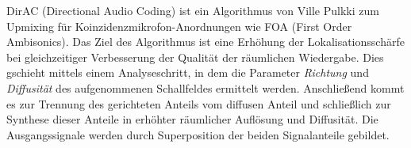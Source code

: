 DirAC (Directional Audio Coding) ist ein Algorithmus von Ville Pulkki \cite{pulkki} zum Upmixing für Koinzidenzmikrofon-Anordnungen wie FOA (First Order Ambisonics). Das Ziel des Algorithmus ist eine Erhöhung der Lokalisationsschärfe bei gleichzeitiger Verbesserung der Qualität der räumlichen Wiedergabe. Dies gschieht mittels einem Analyseschritt, in dem die Parameter \textit{Richtung} und \textit{Diffusität} des aufgenommenen Schallfeldes ermittelt werden. Anschließend kommt es zur Trennung des gerichteten Anteils vom diffusen Anteil und schließlich zur Synthese dieser Anteile in erhöhter räumlicher Auflösung und Diffusität. Die Ausgangssignale werden durch Superposition der beiden Signalanteile gebildet.
